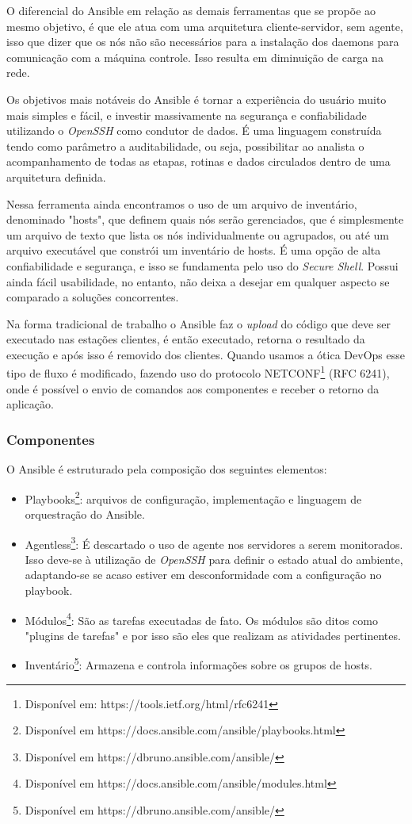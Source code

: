 O diferencial do Ansible em relação as demais ferramentas que se propõe ao mesmo objetivo, é que ele atua com uma arquitetura cliente-servidor, sem agente,  isso que dizer que os nós não são necessários para a instalação dos daemons para comunicação com a máquina controle. Isso resulta em diminuição de carga na rede. 

Os objetivos mais notáveis do Ansible é tornar a experiência do usuário muito mais simples e fácil, e investir massivamente na segurança e confiabilidade utilizando o \textit{OpenSSH} como condutor de dados. É uma linguagem construída tendo como parâmetro a auditabilidade, ou seja, possibilitar ao analista o acompanhamento de todas as etapas, rotinas e dados circulados dentro de uma arquitetura definida.\cite{marcelocosta}

Nessa ferramenta ainda encontramos o uso de um arquivo de inventário, denominado "hosts", que definem quais nós serão gerenciados, que é simplesmente um arquivo de texto que lista os nós individualmente ou agrupados, ou até um arquivo executável que constrói um inventário de hosts. É uma opção de alta confiabilidade e segurança, e isso se fundamenta pelo uso do \textit{Secure Shell}. Possui ainda fácil usabilidade, no entanto, não deixa a desejar em qualquer aspecto se comparado a soluções concorrentes.

Na forma tradicional de trabalho o Ansible faz o \textit{upload} do código que deve ser executado nas estações clientes, é então executado, retorna o resultado da execução e após isso é removido dos clientes. Quando usamos a ótica DevOps esse tipo de fluxo é modificado, fazendo uso do protocolo NETCONF\footnote{Disponível em: https://tools.ietf.org/html/rfc6241} (RFC 6241), onde é possível o envio de comandos aos componentes e receber o retorno da aplicação.

\subsubsection{Componentes}
O Ansible é estruturado pela composição dos seguintes elementos:

\begin{itemize}
	\item Playbooks\footnote{Disponível em https://docs.ansible.com/ansible/playbooks.html}: arquivos de configuração, implementação e linguagem de orquestração do Ansible.
	\item Agentless\footnote{Disponível em https://dbruno.ansible.com/ansible/}: É descartado o uso de agente nos servidores a serem monitorados. Isso deve-se à utilização de \textit{OpenSSH} para definir o estado atual do ambiente, adaptando-se se acaso estiver em desconformidade com a configuração no playbook.
	\item Módulos\footnote{Disponível em https://docs.ansible.com/ansible/modules.html}: São as tarefas executadas de fato. Os módulos são ditos como "plugins de tarefas" e por isso são eles que realizam as atividades pertinentes.
	\item Inventário\footnote{Disponível em https://dbruno.ansible.com/ansible/}: Armazena e controla informações sobre os grupos de hosts.
\end{itemize}

